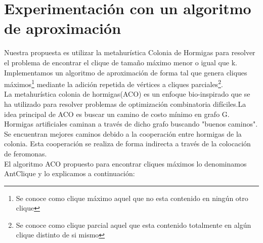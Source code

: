 \documentclass[sn-mathphys,Numbered]{sn-jnl}%
\theoremstyle{thmstyleone}%
\theoremstyle{thmstyletwo}%
\theoremstyle{thmstylethree}%
\begin{document}
\section{Experimentación con un algoritmo de aproximación }
Nuestra propuesta es utilizar la metahur\'istica Colonia de Hormigas para resolver el problema de encontrar el clique de tama\~no máximo menor o igual que k.\\
Implementamos un algoritmo de aproximación de forma tal que genera cliques máximos\footnote{Se conoce como clique m\'aximo aquel que no esta contenido en ning\'un otro clique} mediante la adición repetida de vértices a cliques parciales\footnote{Se conoce como clique parcial aquel que esta contenido totalmente en alg\'un clique distinto de si mismo}.\\
La metahur\'istica colonia de hormigas(ACO) es un enfoque bio-inspirado que se ha utilizado para resolver problemas de optimizaci\'on combinatoria dif\'iciles\cite{2,3}.La idea principal de ACO es buscar un camino de costo mínimo en grafo G. Hormigas artificiales caminan a través de dicho grafo buscando "buenos caminos". Se encuentran mejores caminos debido a la cooperaci\'on entre hormigas de la colonia. Esta cooperación se realiza de forma indirecta a través de la colocaci\'on de feromonas.\\
El algoritmo ACO propuesto para encontrar cliques máximos lo denominamos AntClique y lo explicamos a continuaci\'on:\\
\end{document}
